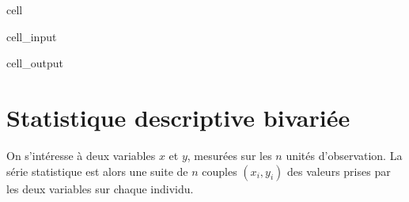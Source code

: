 \documentclass[letterpaper,10pt,french]{sphinxmanual}
\begin{document}
\begin{sphinxuseclass}{cell}
\begin{sphinxuseclass}{cell_input}
\begin{sphinxVerbatim}[commandchars=\\\{\}]
      
              \PYG{p}{[}\PYG{p}{]}\PYG{p}{[}\PYG{p}{]}
        
             
\end{sphinxVerbatim}

\end{sphinxuseclass}
\begin{sphinxuseclass}{cell_output}
\noindent{}

\end{sphinxuseclass}
\end{sphinxuseclass}

\section{Statistique descriptive bivariée}
\label{\detokenize{statsdescriptives:statistique-descriptive-bivariee}}
\sphinxAtStartPar
On s’intéresse à deux variables \(x\) et \(y\), mesurées sur les \(n\) unités d’observation. La série statistique est alors une suite de \(n\) couples \((x_i,y_i)\) des valeurs prises par les deux variables sur chaque individu.
\end{document}
